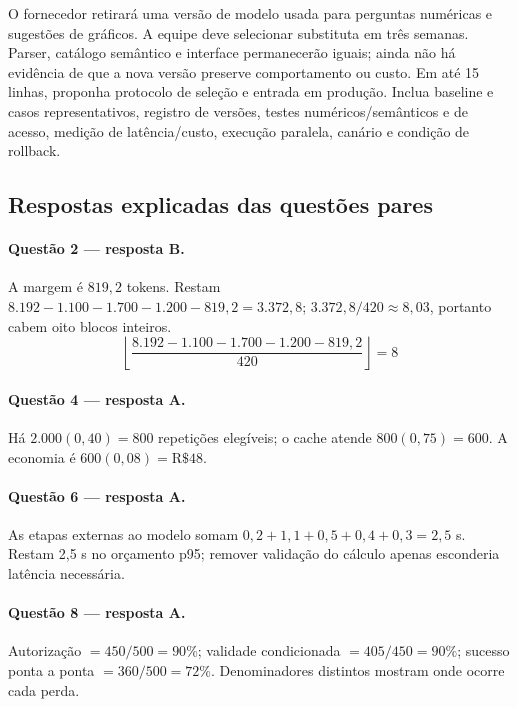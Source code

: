 \TextoBase
O fornecedor retirará uma versão de modelo usada para perguntas numéricas e sugestões de gráficos. A equipe deve selecionar substituta em três semanas. Parser, catálogo semântico e interface permanecerão iguais; ainda não há evidência de que a nova versão preserve comportamento ou custo.
\FonteDidatica
\Comando Em até 15 linhas, proponha protocolo de seleção e entrada em produção. Inclua baseline e casos representativos, registro de versões, testes numéricos/semânticos e de acesso, medição de latência/custo, execução paralela, canário e condição de rollback.

\newpage
\subsection{Respostas explicadas das questões pares}

\paragraph{Questão 2 — resposta B.} A margem é $819{,}2$ tokens. Restam $8.192-1.100-1.700-1.200-819{,}2=3.372{,}8$; $3.372{,}8/420\approx8{,}03$, portanto cabem oito blocos inteiros.
\[\left\lfloor\frac{8.192-1.100-1.700-1.200-819{,}2}{420}\right\rfloor=8\]

\paragraph{Questão 4 — resposta A.} Há $2.000(0{,}40)=800$ repetições elegíveis; o cache atende $800(0{,}75)=600$. A economia é $600(0{,}08)=\mathrm{R\$}48$.

\paragraph{Questão 6 — resposta A.} As etapas externas ao modelo somam $0{,}2+1{,}1+0{,}5+0{,}4+0{,}3=2{,}5$ s. Restam 2,5 s no orçamento p95; remover validação do cálculo apenas esconderia latência necessária.

\paragraph{Questão 8 — resposta A.} Autorização $=450/500=90\%$; validade condicionada $=405/450=90\%$; sucesso ponta a ponta $=360/500=72\%$. Denominadores distintos mostram onde ocorre cada perda.

